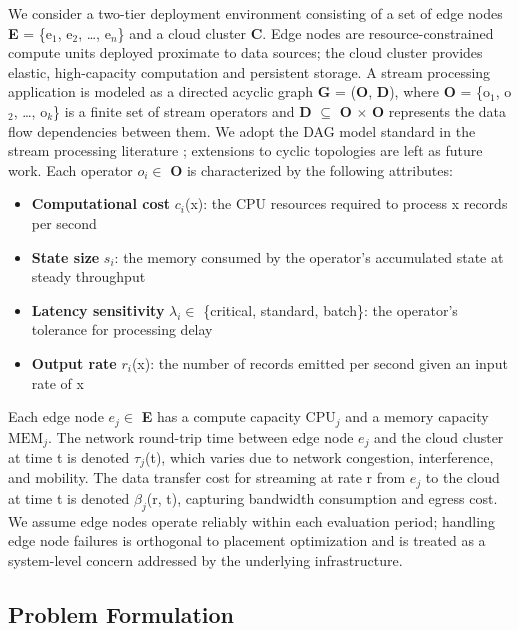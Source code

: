 \documentclass[preprint,review,12pt]{elsarticle}
\providecommand{\tightlist}{\setlength{\itemsep}{0pt}\setlength{\parskip}{0pt}}
\begin{document}
We consider a two-tier deployment environment consisting of a set of edge nodes \textbf{E} = \{e$_1$, e$_2$, \ldots, e$_n$\} and a cloud cluster \textbf{C}. Edge nodes are resource-constrained compute units deployed proximate to data sources; the cloud cluster provides elastic, high-capacity computation and persistent storage. A stream processing application is modeled as a directed acyclic graph \textbf{G} = (\textbf{O}, \textbf{D}), where \textbf{O} = \{o$_1$, o$_2$, \ldots, o$_k$\} is a finite set of stream operators and \textbf{D} $\subseteq$ \textbf{O} $\times$ \textbf{O} represents the data flow dependencies between them. We adopt the DAG model standard in the stream processing literature \cite{carbone2015flink,toshniwal2014storm,kulkarni2015heron}; extensions to cyclic topologies are left as future work. Each operator $o_i\in$ \textbf{O} is characterized by the following attributes:

\begin{itemize}
\tightlist
\item
  \textbf{Computational cost} $c_i$(x): the CPU resources required to process x records per second
\item
  \textbf{State size} $s_i$: the memory consumed by the operator's accumulated state at steady throughput
\item
  \textbf{Latency sensitivity} $\lambda_i\in$ \{critical, standard, batch\}: the operator's tolerance for processing delay
\item
  \textbf{Output rate} $r_i$(x): the number of records emitted per second given an input rate of x
\end{itemize}

Each edge node $e_j\in$ \textbf{E} has a compute capacity $\text{CPU}_j$ and a memory capacity $\text{MEM}_j$. The network round-trip time between edge node $e_j$ and the cloud cluster at time t is denoted $\tau_j$(t), which varies due to network congestion, interference, and mobility. The data transfer cost for streaming at rate r from $e_j$ to the cloud at time t is denoted $\beta_j$(r, t), capturing bandwidth consumption and egress cost. We assume edge nodes operate reliably within each evaluation period; handling edge node failures is orthogonal to placement optimization and is treated as a system-level concern addressed by the underlying infrastructure.

\subsection{Problem Formulation}\label{problem-formulation}
\end{document}
